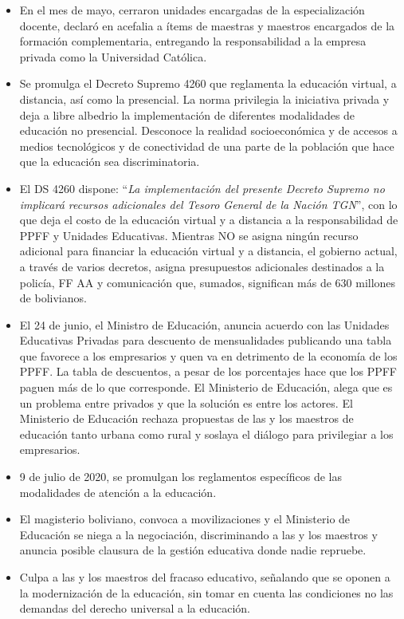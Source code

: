 \documentclass[a4paper, nobind]{templates/ociamthesis}
\begin{document}
\begin{itemize}
\item
  En el mes de mayo, cerraron unidades encargadas de la especialización docente, declaró en acefalia a ítems de maestras y maestros encargados de la formación complementaria, entregando la responsabilidad a la empresa privada como la Universidad Católica.
\item
  Se promulga el Decreto Supremo 4260 que reglamenta la educación virtual, a distancia, así como la presencial. La norma privilegia la iniciativa privada y deja a libre albedrio la implementación de diferentes modalidades de educación no presencial. Desconoce la realidad socioeconómica y de accesos a medios tecnológicos y de conectividad de una parte de la población que hace que la educación sea discriminatoria.
\item
  El DS 4260 dispone: ``\emph{La implementación del presente Decreto Supremo no implicará recursos adicionales del Tesoro General de la Nación TGN}'', con lo que deja el costo de la educación virtual y a distancia a la responsabilidad de PPFF y Unidades Educativas. Mientras NO se asigna ningún recurso adicional para financiar la educación virtual y a distancia, el gobierno actual, a través de varios decretos, asigna presupuestos adicionales destinados a la policía, FF AA y comunicación que, sumados, significan más de 630 millones de bolivianos.
\item
  El 24 de junio, el Ministro de Educación, anuncia acuerdo con las Unidades Educativas Privadas para descuento de mensualidades publicando una tabla que favorece a los empresarios y quen va en detrimento de la economía de los PPFF. La tabla de descuentos, a pesar de los porcentajes hace que los PPFF paguen más de lo que corresponde. El Ministerio de Educación, alega que es un problema entre privados y que la solución es entre los actores. El Ministerio de Educación rechaza propuestas de las y los maestros de educación tanto urbana como rural y soslaya el diálogo para privilegiar a los empresarios.
\item
  9 de julio de 2020, se promulgan los reglamentos específicos de las modalidades de atención a la educación.
\item
  El magisterio boliviano, convoca a movilizaciones y el Ministerio de Educación se niega a la negociación, discriminando a las y los maestros y anuncia posible clausura de la gestión educativa donde nadie repruebe.
\item
  Culpa a las y los maestros del fracaso educativo, señalando que se oponen a la modernización de la educación, sin tomar en cuenta las condiciones no las demandas del derecho universal a la educación.

\end{itemize}
\end{document}
